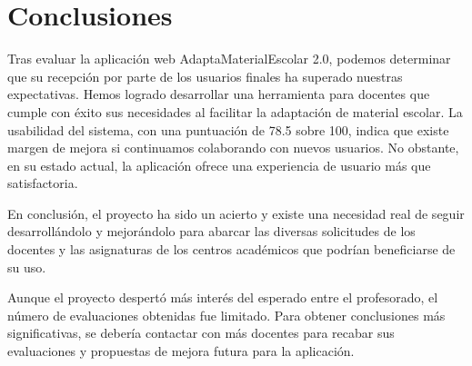\section{Conclusiones}\label{sec:conclusionesEvaluacion}
Tras evaluar la aplicación web AdaptaMaterialEscolar 2.0, podemos determinar que su recepción por parte de los usuarios finales ha superado nuestras expectativas. Hemos logrado desarrollar una herramienta para docentes que cumple con éxito sus necesidades al facilitar la adaptación de material escolar. La usabilidad del sistema, con una puntuación de 78.5 sobre 100, indica que existe margen de mejora si continuamos colaborando con nuevos usuarios. No obstante, en su estado actual, la aplicación ofrece una experiencia de usuario más que satisfactoria.

En conclusión, el proyecto ha sido un acierto y existe una necesidad real de seguir desarrollándolo y mejorándolo para abarcar las diversas solicitudes de los docentes y las asignaturas de los centros académicos que podrían beneficiarse de su uso.

Aunque el proyecto despertó más interés del esperado entre el profesorado, el número de evaluaciones obtenidas fue limitado. Para obtener conclusiones más significativas, se debería contactar con más docentes para recabar sus evaluaciones y propuestas de mejora futura para la aplicación.